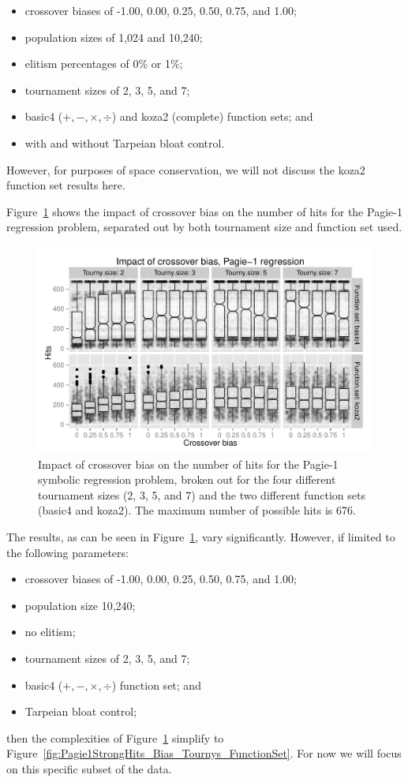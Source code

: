 \documentclass{sig-alternate}
\begin{document}
\begin{itemize}
	\item crossover biases of -1.00, 0.00, 0.25, 0.50, 0.75, and 1.00;
	\item population sizes of 1,024 and 10,240;
	\item elitism percentages of 0\% or 1\%;
	\item tournament sizes of 2, 3, 5, and 7;
	\item basic4 ($+, -, \times, \div$) and koza2 (complete) function sets; and
	\item with and without Tarpeian bloat control.
\end{itemize}

However, for purposes of space conservation, we will not discuss the koza2 function set results here.

Figure~\ref{fig:Pagie1Hits_Bias_Tournys_FunctionSet} shows the impact of crossover bias on the number of hits for the
Pagie-1 regression problem, separated out by both tournament size and function set used.

\begin{figure}
\centering
\includegraphics[width=0.45 \textwidth]{Plots/Pagie_1_Hits_vs_Bias_Tournys_FunctionSet.pdf}
\caption{Impact of crossover bias on the number of hits for the Pagie-1 symbolic regression problem, broken out for the
four different tournament sizes (2, 3, 5, and 7) and the two different function sets (basic4 and koza2). The maximum
number of possible hits is 676.}
\label{fig:Pagie1Hits_Bias_Tournys_FunctionSet}
\end{figure}

The results, as can be seen in Figure~\ref{fig:Pagie1Hits_Bias_Tournys_FunctionSet}, vary significantly. However, if limited to the following parameters:
\begin{itemize}
    \item crossover biases of -1.00, 0.00, 0.25, 0.50, 0.75, and 1.00;
    \item population size 10,240;
    \item no elitism;
    \item tournament sizes of 2, 3, 5, and 7;
	\item basic4 ($+, -, \times, \div$) function set; and
	\item Tarpeian bloat control;
\end{itemize}
then the complexities of Figure~\ref{fig:Pagie1Hits_Bias_Tournys_FunctionSet} simplify to
Figure~\ref{fig:Pagie1StrongHits_Bias_Tournys_FunctionSet}. For now we will focus on this specific subset of the data.
\end{document}
